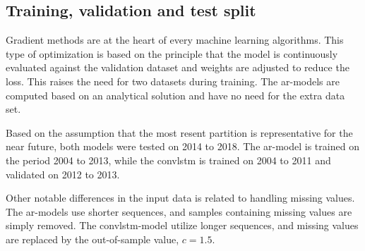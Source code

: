 \subsection{Training, validation and test split}
Gradient methods are at the heart of every machine 
learning algorithms. This type of optimization is based on the principle that the model is continuously evaluated against the validation dataset and weights are adjusted to reduce the loss. This raises the need for two datasets during training. The \acrshort{ar}-models are computed based on an analytical solution and have no need for the extra data set. 

Based on the assumption that the most resent partition is representative for the near future, both models were tested on 2014 to 2018. The \acrshort{ar}-model is trained on the period 2004 to 2013, while the \acrshort{convlstm} is trained on  2004 to 2011 and validated on 2012 to 2013.

Other notable differences in the input data is related to handling missing values.  
The \acrshort{ar}-models use shorter sequences, and samples containing missing values are simply removed. The \acrshort{convlstm}-model utilize longer sequences, and missing values are replaced by the out-of-sample value, $c=1.5$. 

